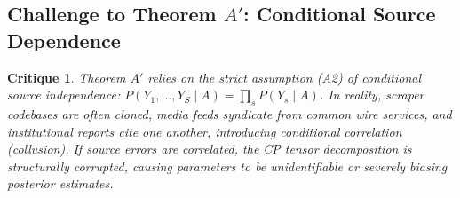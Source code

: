 \documentclass[11pt,a4paper]{article}
\newtheorem{critique}{Critique}
\begin{document}
\subsection{Challenge to Theorem $A'$: Conditional Source Dependence}
\begin{critique}
Theorem $A'$ relies on the strict assumption (A2) of conditional source independence: $P(Y_1, \dots, Y_S \mid A) = \prod_s P(Y_s \mid A)$. In reality, scraper codebases are often cloned, media feeds syndicate from common wire services, and institutional reports cite one another, introducing conditional correlation (collusion). If source errors are correlated, the CP tensor decomposition is structurally corrupted, causing parameters to be unidentifiable or severely biasing posterior estimates. %
\end{critique}
\end{document}
